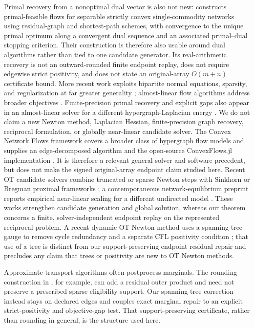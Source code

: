 \documentclass[smallextended,envcountsect]{svjour3}
\begin{document}
 Primal recovery from a nonoptimal dual vector is also not new:
 \citep{marklund2008early} constructs primal-feasible flows for separable
 strictly convex single-commodity networks using residual-graph and
 shortest-path schemes, with convergence to the unique primal optimum along a
 convergent dual sequence and an associated primal--dual stopping criterion.
 Their construction is therefore also usable around dual algorithms rather
 than tied to one candidate generator.  Its real-arithmetic recovery is not an
 outward-rounded finite endpoint replay, does not require edgewise strict
 positivity, and does not state an original-array $O(m+n)$ certificate bound.
More recent work exploits bipartite normal equations, sparsity, and
regularization at far greater generality
\citep{castro2021huge,wright2023direct,cipolla2024sparse,tang2024safe,
wang2025splr};
almost-linear flow algorithms address broader objectives
\citep{chen2025maxflow}.  Finite-precision primal recovery and explicit gaps
also appear in an almost-linear solver for a different hypergraph-Laplacian
energy \citep{yoshida2026hypergraph}.  We do not claim a new Newton method,
Laplacian Hessian, finite-precision graph recovery, reciprocal formulation, or
globally near-linear candidate solver.
The Convex Network Flows framework covers a broader class of hypergraph flow
models and supplies an edge-decomposed algorithm and the open-source
ConvexFlows.jl implementation \citep{diamandis2024convexflows}.  It is therefore
a relevant general solver and software precedent, but does not make the signed
original-array endpoint claim studied here.
Recent OT candidate solvers combine truncated or sparse Newton steps with
Sinkhorn or Bregman proximal frameworks
\citep{kemertas2025truncated,wu2025pins,pan2026ibsn}; a contemporaneous
network-equilibrium preprint reports empirical near-linear scaling for a
different undirected model \citep{livne2026nlf}.  These works strengthen
candidate generation and global solution, whereas our theorem concerns a
finite, solver-independent endpoint replay on the represented reciprocal
problem.  A recent dynamic-OT Newton method uses a spanning-tree gauge to remove
cycle redundancy and a separate CFL positivity condition
\citep{chen2026graphot}; that use of a tree is distinct from our
support-preserving endpoint residual repair and precludes any claim that trees
or positivity are new to OT Newton methods.

Approximate transport algorithms often postprocess marginals.  The rounding
construction in \citep{altschuler2017nearlinear}, for example, can add a residual
outer product and need not preserve a prescribed sparse eligibility support.
Our spanning-tree correction instead stays on declared edges and couples exact
marginal repair to an explicit strict-positivity and objective-gap test.  That
support-preserving certificate, rather than rounding in general, is the
structure used here.
\end{document}
